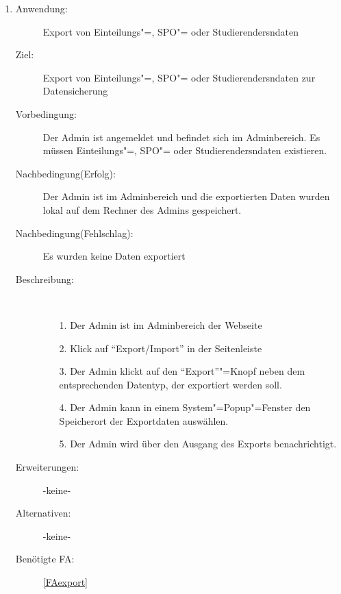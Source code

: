 \documentclass[parskip=full]{scrartcl}
\newcommand{\swtLabel}[1]{\textbf{/#1\arabic*0/}}
\begin{document}
\begin{enumerate} [label=\swtLabel{A}]
      \item \label{UCadminExport}
    \begin{description}
    \item[Anwendung:] Export von \gls{Einteilung}s"=, \gls{SPO}"= oder \glspl{Studierender}ndaten
    \item[Ziel:] Export von \gls{Einteilung}s"=, \gls{SPO}"= oder \glspl{Studierender}ndaten zur Datensicherung
    \item[Vorbedingung:] Der \gls{Admin} ist angemeldet und befindet sich im
    \gls{Admin}bereich. Es müssen  \gls{Einteilung}s"=, \gls{SPO}"= oder \glspl{Studierender}ndaten existieren.
    \item[Nachbedingung(Erfolg):] Der \gls{Admin} ist im \gls{Admin}bereich und die exportierten Daten wurden lokal auf dem Rechner des \gls{Admin}s gespeichert.
    \item[Nachbedingung(Fehlschlag):] Es wurden keine Daten exportiert
    \item[Beschreibung:]~
    \begin{enumerate}
      \item[1.] Der \gls{Admin} ist im \gls{Admin}bereich der Webseite
      \item[2.] Klick auf \enquote{Export/Import} in der Seitenleiste
       \item[3.] Der \gls{Admin} klickt auf den \enquote{Export}"=Knopf neben dem entsprechenden Datentyp, der exportiert werden soll.
       \item[4.] Der \gls{Admin} kann in einem System"=Popup"=Fenster den Speicherort der Exportdaten auswählen.
      \item[5.] Der \gls{Admin} wird über den Ausgang des Exports benachrichtigt.
    \end{enumerate}
    \item[Erweiterungen:] -keine-
    \item[Alternativen:] -keine-
    \item[Benötigte FA:] \ref{FAexport}
  \end{description}
  

\end{enumerate}
\end{document}

